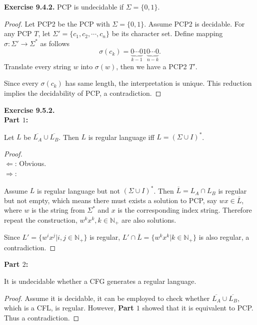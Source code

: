\documentclass[a4paper]{article}
\newtheorem*{proof}{Proof}
\newenvironment{exercise}[1]{
	\par
	\noindent\textbf{Exercise #1.}\quad
}{
	\par
	\bigskip
}
\newcommand{\Nset}{\mathbb{N}}
\begin{document}
\begin{exercise}{9.4.2} PCP is undecidable if $\Sigma=\{0,1\}$.
    \begin{proof}
        Let PCP2 be the PCP with $\Sigma=\{0,1\}$. Assume PCP2 is decidable.
        For any PCP $T$, let $\Sigma'=\{c_1,c_2,\cdots,c_n\}$ be its character set.
        Define mapping $\sigma:\Sigma'\to\Sigma^*$ as follows
        $$
        \sigma(c_k)=\underbrace{0\cdots 0}_{k-1}1\underbrace{0\cdots 0}_{n-k}.
        $$
        Translate every string $w$ into $\sigma(w)$, then we have a PCP2 $T'$.\par
        Since every $\sigma(c_k)$ has same length, the interpretation is unique. This
        reduction implies the decidability of PCP, a contradiction.
    \end{proof}
\end{exercise}

\begin{exercise}{9.5.2} \hspace{0pt}\\
    \textbf{Part $1$:}\par
    Let $L$ be $\overline{L_A}\cup\overline{L_B}$.
    Then $L$ is regular language iff $L=(\Sigma\cup I)^*$.
    \begin{proof}\hspace{0pt}\\
        $\Leftarrow$: Obvious.\\
        $\Rightarrow$: \par
        Assume $L$ is regular language but not $(\Sigma\cup I)^*$.
        Then $\overline{L}=L_A\cap L_B$ is regular but not empty,
        which means there must exists a solution to
        PCP, say $wx\in\overline{L}$, where $w$ is the string from $\Sigma^*$ and $x$ is the corresponding index string.
        Therefore repeat the construction, $w^kx^k,k\in\Nset_+$ are also solutions.\par
        Since $L'=\{w^ix^j|i,j\in\Nset_+\}$ is regular, $L'\cap\overline{L}=\{w^kx^k|k\in\Nset_+\}$ is also
        regular, a contradiction.
    \end{proof}
    \textbf{Part $2$:}\par
    It is undecidable whether a CFG generates a regular language.
    \begin{proof}
        Assume it is decidable, it can be employed to check whether $\overline{L_A}\cup\overline{L_B}$,
        which is a CFL, is regular. However, \textbf{Part $1$} showed that it is equivalent to PCP. Thus a contradiction.
    \end{proof}
\end{exercise}
\end{document}
